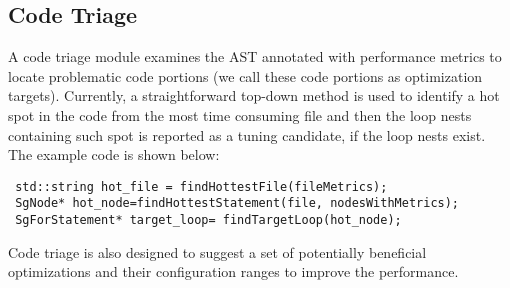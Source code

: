 \subsection{Code Triage}
A code triage module examines the AST annotated with
performance metrics to locate problematic code portions (we call these code portions
as optimization targets).
Currently, a straightforward top-down method is used to identify a hot spot
in the code from the most time consuming file and then the loop nests containing such spot is reported as a
tuning candidate, if the loop nests exist. The example code is shown below:
{\mySmallFontSize
\begin{verbatim}
 std::string hot_file = findHottestFile(fileMetrics);
 SgNode* hot_node=findHottestStatement(file, nodesWithMetrics);
 SgForStatement* target_loop= findTargetLoop(hot_node);

\end{verbatim}
}
Code triage is also designed to suggest a set of potentially beneficial optimizations and
their configuration ranges to improve the performance.


